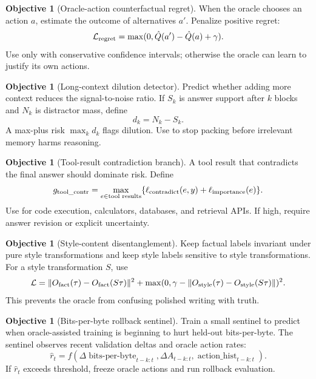\documentclass[11pt]{article}
\theoremstyle{definition}
\newtheorem{objective}[theorem]{Objective}
\theoremstyle{remark}
\newcommand{\loss}{\mathcal{L}}
\newcommand{\bits}{\operatorname{bits\mbox{-}per\mbox{-}byte}}
\numberwithin{equation}{section}
\begin{document}
\begin{objective}[Oracle-action counterfactual regret]
When the oracle chooses an action \(a\), estimate the outcome of alternatives \(a'\).  Penalize positive regret:
\begin{equation}
    \loss_{\rm regret}=\max(0,\hat Q(a')-\hat Q(a)+\gamma).
\end{equation}
Use only with conservative confidence intervals; otherwise the oracle can learn to justify its own actions.
\end{objective}

\begin{objective}[Long-context dilution detector]
Predict whether adding more context reduces the signal-to-noise ratio.  If \(S_k\) is answer support after \(k\) blocks and \(N_k\) is distractor mass, define
\begin{equation}
    d_k=N_k-S_k.
\end{equation}
A max-plus risk \(\max_k d_k\) flags dilution.  Use to stop packing before irrelevant memory harms reasoning.
\end{objective}

\begin{objective}[Tool-result contradiction branch]
A tool result that contradicts the final answer should dominate risk.  Define
\begin{equation}
    g_{\rm tool\_contr}=\max_{e\in\text{tool results}} \{\ell_{\rm contradict}(e,y)+\ell_{\rm importance}(e)\}.
\end{equation}
Use for code execution, calculators, databases, and retrieval APIs.  If high, require answer revision or explicit uncertainty.
\end{objective}

\begin{objective}[Style-content disentanglement]
Keep factual labels invariant under pure style transformations and keep style labels sensitive to style transformations.  For a style transformation \(S\), use
\begin{equation}
    \loss=\|O_{\rm fact}(\tau)-O_{\rm fact}(S\tau)\|^2+\max(0,\gamma-\|O_{\rm style}(\tau)-O_{\rm style}(S\tau)\|)^2.
\end{equation}
This prevents the oracle from confusing polished writing with truth.
\end{objective}

\begin{objective}[Bits-per-byte rollback sentinel]
Train a small sentinel to predict when oracle-assisted training is beginning to hurt held-out bits-per-byte.  The sentinel observes recent validation deltas and oracle action rates:
\begin{equation}
    \hat r_t=f(\Delta\bits_{t-k:t},\Delta A_{t-k:t},\operatorname{action\_hist}_{t-k:t}).
\end{equation}
If \(\hat r_t\) exceeds threshold, freeze oracle actions and run rollback evaluation.
\end{objective}
\end{document}
